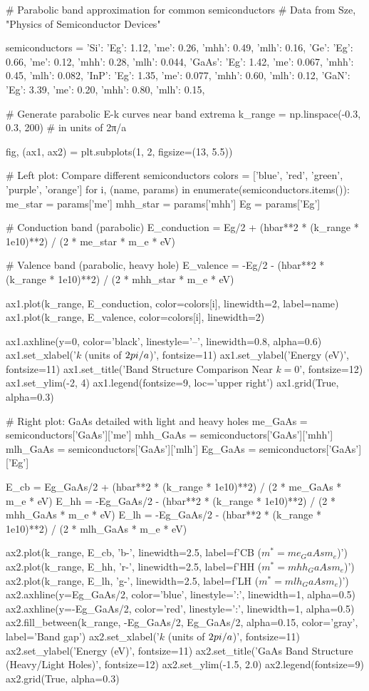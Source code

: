 \documentclass[11pt,a4paper]{article}
\begin{document}
\begin{pycode}
# Parabolic band approximation for common semiconductors
# Data from Sze, "Physics of Semiconductor Devices"

semiconductors = {
    'Si': {'Eg': 1.12, 'me': 0.26, 'mhh': 0.49, 'mlh': 0.16},
    'Ge': {'Eg': 0.66, 'me': 0.12, 'mhh': 0.28, 'mlh': 0.044},
    'GaAs': {'Eg': 1.42, 'me': 0.067, 'mhh': 0.45, 'mlh': 0.082},
    'InP': {'Eg': 1.35, 'me': 0.077, 'mhh': 0.60, 'mlh': 0.12},
    'GaN': {'Eg': 3.39, 'me': 0.20, 'mhh': 0.80, 'mlh': 0.15},
}

# Generate parabolic E-k curves near band extrema
k_range = np.linspace(-0.3, 0.3, 200)  # in units of 2π/a

fig, (ax1, ax2) = plt.subplots(1, 2, figsize=(13, 5.5))

# Left plot: Compare different semiconductors
colors = ['blue', 'red', 'green', 'purple', 'orange']
for i, (name, params) in enumerate(semiconductors.items()):
    me_star = params['me']
    mhh_star = params['mhh']
    Eg = params['Eg']

    # Conduction band (parabolic)
    E_conduction = Eg/2 + (hbar**2 * (k_range * 1e10)**2) / (2 * me_star * m_e * eV)

    # Valence band (parabolic, heavy hole)
    E_valence = -Eg/2 - (hbar**2 * (k_range * 1e10)**2) / (2 * mhh_star * m_e * eV)

    ax1.plot(k_range, E_conduction, color=colors[i], linewidth=2, label=name)
    ax1.plot(k_range, E_valence, color=colors[i], linewidth=2)

ax1.axhline(y=0, color='black', linestyle='--', linewidth=0.8, alpha=0.6)
ax1.set_xlabel('$k$ (units of $2\\pi/a$)', fontsize=11)
ax1.set_ylabel('Energy (eV)', fontsize=11)
ax1.set_title('Band Structure Comparison Near $k=0$', fontsize=12)
ax1.set_ylim(-2, 4)
ax1.legend(fontsize=9, loc='upper right')
ax1.grid(True, alpha=0.3)

# Right plot: GaAs detailed with light and heavy holes
me_GaAs = semiconductors['GaAs']['me']
mhh_GaAs = semiconductors['GaAs']['mhh']
mlh_GaAs = semiconductors['GaAs']['mlh']
Eg_GaAs = semiconductors['GaAs']['Eg']

E_cb = Eg_GaAs/2 + (hbar**2 * (k_range * 1e10)**2) / (2 * me_GaAs * m_e * eV)
E_hh = -Eg_GaAs/2 - (hbar**2 * (k_range * 1e10)**2) / (2 * mhh_GaAs * m_e * eV)
E_lh = -Eg_GaAs/2 - (hbar**2 * (k_range * 1e10)**2) / (2 * mlh_GaAs * m_e * eV)

ax2.plot(k_range, E_cb, 'b-', linewidth=2.5, label=f'CB ($m^* = {me_GaAs} m_e$)')
ax2.plot(k_range, E_hh, 'r-', linewidth=2.5, label=f'HH ($m^* = {mhh_GaAs} m_e$)')
ax2.plot(k_range, E_lh, 'g-', linewidth=2.5, label=f'LH ($m^* = {mlh_GaAs} m_e$)')
ax2.axhline(y=Eg_GaAs/2, color='blue', linestyle=':', linewidth=1, alpha=0.5)
ax2.axhline(y=-Eg_GaAs/2, color='red', linestyle=':', linewidth=1, alpha=0.5)
ax2.fill_between(k_range, -Eg_GaAs/2, Eg_GaAs/2, alpha=0.15, color='gray', label='Band gap')
ax2.set_xlabel('$k$ (units of $2\\pi/a$)', fontsize=11)
ax2.set_ylabel('Energy (eV)', fontsize=11)
ax2.set_title('GaAs Band Structure (Heavy/Light Holes)', fontsize=12)
ax2.set_ylim(-1.5, 2.0)
ax2.legend(fontsize=9)
ax2.grid(True, alpha=0.3)


\end{pycode}
\end{document}
